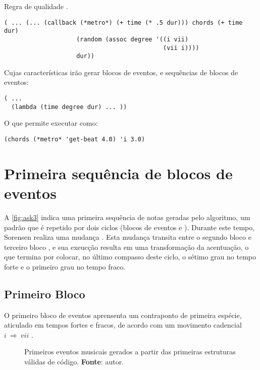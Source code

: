 \begin{example}{Regra de qualidade .}
\begin{verbatim}
( ... (... (callback (*metro*) (+ time (* .5 dur))) chords (+ time dur)
                    (random (assoc degree '((i vii)
                                            (vii i))))
                    dur))
\end{verbatim}

Cujas características irão gerar blocos de eventos, e sequências de blocos de eventos:

\begin{verbatim}
( ...
  (lambda (time degree dur) ... ))
\end{verbatim}

O que permite executar como:
\begin{verbatim}
(chords (*metro* 'get-beat 4.0) 'i 3.0)
\end{verbatim}
\end{example}

\section{Primeira sequência de blocos de eventos}\label{sec:primeiro_evento}

A \autoref{fig:ask3} indica uma primeira sequência de notas geradas pelo algoritmo, um padrão que é repetido por dois ciclos (blocos de eventos  e ). Durante este tempo, Sorensen realiza uma mudança . Esta mudança transita entre o segundo bloco  e terceiro bloco , e sua exeucção resulta em uma transformação da acentuação, o que termina por colocar, no último compasso deste ciclo, o sétimo grau no tempo forte e o primeiro grau no tempo fraco. 

\subsection{Primeiro Bloco}

O primeiro bloco de eventos  aprensenta um contraponto de primeira espécie, aticulado em tempos fortes e fracos, de acordo com um movimento cadencial $i~\Rightarrow~vii$ . 

\begin{figure}[!h]
  \centering
  
  \caption{Primeiros eventos musicais gerados a partir das primeiras estruturas válidas de código. \textbf{Fonte}: autor.}
  \label{fig:ask3}
\end{figure}

